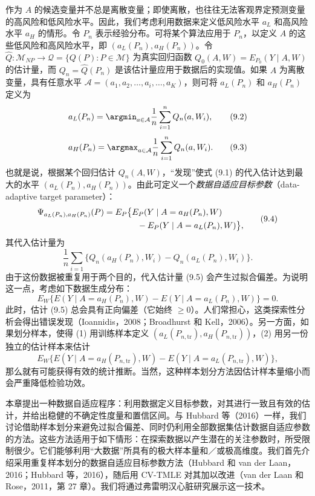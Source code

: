 作为 $A$ 的候选变量并不总是离散变量；即使离散，也往往无法客观界定预测变量的高风险和低风险水平。因此，我们考虑利用数据来定义低风险水平 $a_L$ 和高风险水平 $a_H$ 的情形。令 $P_n$ 表示经验分布。可将某个算法应用于 $P_n$，以定义 $A$ 的这些低风险和高风险水平，即 $(a_L(P_n),a_H(P_n))$。令 $\hat Q:\mathcal M_{NP}\to\mathcal Q=\{Q(P):P\in\mathcal M\}$ 为真实回归函数 $Q_0(A,W)=E_{P_0}(Y\mid A,W)$ 的估计量，而 $Q_n=\hat Q(P_n)$ 是该估计量应用于数据后的实现值。如果 $A$ 为离散变量，具有任意水平 $\mathcal A=(a_1,a_2,\ldots,a_i,\ldots,a_K)$，则可将 $a_L(P_n)$ 和 $a_H(P_n)$ 定义为
\begin{equation}
a_L(P_n)=\argmin_{a\in\mathcal A}\frac1n\sum_{i=1}^n Q_n(a,W_i),
\tag{9.2}
\end{equation}
\begin{equation}
a_H(P_n)=\argmax_{a\in\mathcal A}\frac1n\sum_{i=1}^n Q_n(a,W_i).
\tag{9.3}
\end{equation}
也就是说，根据某个回归估计 $Q_n(A,W)$，“发现”使式 (9.1) 的代入估计达到最大的水平 $(a_L(P_n),a_H(P_n))$。由此可定义一个\emph{数据自适应目标参数}（data-adaptive target parameter）：
\begin{equation}
\begin{aligned}
\Psi_{a_L(P_n),a_H(P_n)}(P)
={}&E_P\bigl\{E_P(Y\mid A=a_H(P_n),W)\\
&\hspace{2.6em}-E_P(Y\mid A=a_L(P_n),W)\bigr\},
\end{aligned}
\tag{9.4}
\end{equation}
其代入估计量为
\begin{equation}
\frac1n\sum_{i=1}\{Q_n(a_H(P_n),W_i)-Q_n(a_L(P_n),W_i)\}.
\tag{9.5}
\end{equation}
由于这份数据被重复用于两个目的，代入估计量 (9.5) 会产生过拟合偏差。为说明这一点，考虑如下数据生成分布：
\[
E_W\{E(Y\mid A=a_H(P_n),W)-E(Y\mid A=a_L(P_n),W)\}=0.
\]
此时，估计 (9.5) 总会具有正向偏差（它始终 $\geq0$）。人们常担心，这类探索性分析会得出错误发现（Ioannidis，2008；Broadhurst 和 Kell，2006）。另一方面，如果划分样本，使得 (1) 用训练样本定义 $(a_L(P_{n,\mathrm{tr}}),a_H(P_{n,\mathrm{tr}}))$，(2) 用另一份独立的估计样本来估计
\[
E_W\bigl\{E(Y\mid A=a_H(P_{n,\mathrm{tr}}),W)
-E(Y\mid A=a_L(P_{n,\mathrm{tr}}),W)\bigr\},
\]
那么就有可能获得有效的统计推断。当然，这种样本划分方法因估计样本量缩小而会严重降低检验功效。

\begin{sourcebox}
本章提出一种数据自适应程序：利用数据定义目标参数，对其进行一致且有效的估计，并给出稳健的不确定性度量和置信区间。与 Hubbard 等（2016）一样，我们讨论借助样本划分来避免过拟合偏差、同时仍利用全部数据集估计数据自适应参数的方法。这些方法适用于如下情形：在探索数据以产生潜在的关注参数时，所受限制很少。它们能够利用“大数据”所具有的极大样本量和／或极高维度。我们首先介绍采用重复样本划分的数据自适应目标参数方法（Hubbard 和 van der Laan，2016；Hubbard 等，2016），随后用 CV-TMLE 对其加以改进（van der Laan 和 Rose，2011，第 27 章）。我们将通过弗雷明汉心脏研究展示这一技术。
\end{sourcebox}

